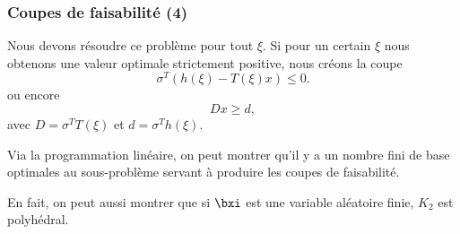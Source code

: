 \begin{frame}
	\frametitle{Coupes de faisabilité (4)}
	
	Nous devons résoudre ce problème pour tout $\xi$.
	Si pour un certain $\xi$ nous obtenons une valeur optimale strictement
	positive, nous créons la coupe
	\[
	\sigma^T(h(\xi)-T(\xi)x) \leq 0.
	\]
	ou encore
	\[
	Dx \geq d,
	\]
	avec $D = \sigma^TT(\xi)$ et $d = \sigma^Th(\xi)$.
	
	\mbox{}
	
	Via la programmation linéaire, on peut montrer qu'il y a un nombre
	fini de base optimales au sous-problème servant à produire les coupes
	de faisabilité.
	\mbox{}
	
	En fait, on peut aussi montrer que si $\bxi$ est une variable aléatoire
	finie, $K_2$ est polyhédral.
	
\end{frame}


